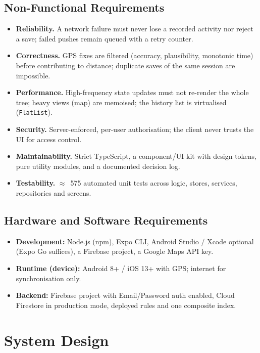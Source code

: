 \documentclass[11pt,a4paper]{report}
\begin{document}
\section{Non-Functional Requirements}
\begin{itemize}[nosep]
    \item \textbf{Reliability.} A network failure must never lose a recorded activity nor reject a save; failed pushes remain queued with a retry counter.
    \item \textbf{Correctness.} GPS fixes are filtered (accuracy, plausibility, monotonic time) before contributing to distance; duplicate saves of the same session are impossible.
    \item \textbf{Performance.} High-frequency state updates must not re-render the whole tree; heavy views (map) are memoised; the history list is virtualised (\texttt{FlatList}).
    \item \textbf{Security.} Server-enforced, per-user authorisation; the client never trusts the UI for access control.
    \item \textbf{Maintainability.} Strict TypeScript, a component/UI kit with design tokens, pure utility modules, and a documented decision log.
    \item \textbf{Testability.} $\approx$~575 automated unit tests across logic, stores, services, repositories and screens.
\end{itemize}

\section{Hardware and Software Requirements}
\begin{itemize}[nosep]
    \item \textbf{Development:} Node.js (npm), Expo CLI, Android Studio / Xcode optional (Expo Go suffices), a Firebase project, a Google Maps API key.
    \item \textbf{Runtime (device):} Android 8+ / iOS 13+ with GPS; internet for synchronisation only.
    \item \textbf{Backend:} Firebase project with Email/Password auth enabled, Cloud Firestore in production mode, deployed rules and one composite index.
\end{itemize}

\chapter{System Design}
\end{document}
